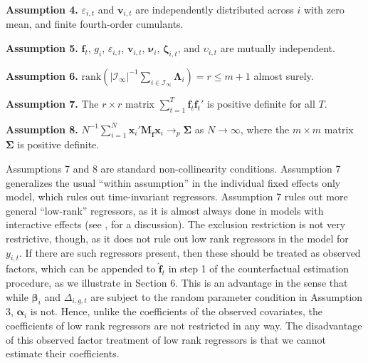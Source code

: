 \documentclass[12pt,fleqn]{article}
\def\*#1{\mathbf{#1}}
\def\+#1{\boldsymbol{#1}}
\begin{document}
\bigskip

\noindent \textbf{Assumption 4.} $\varepsilon_{i,t}$ and $\*v_{i,t}$ are independently distributed across $i$ with zero mean, and finite fourth-order cumulants.

\bigskip

\noindent \textbf{Assumption 5.} $\*f_t$, $g_i$, $\varepsilon_{i,t}$, $\*v_{i,t}$, $\+\nu_i$, $\+\zeta_{i,t}$, and $\upsilon_{i,t}$ are mutually independent.

\bigskip

\noindent \textbf{Assumption 6.} $\mathrm{rank}(|\mathcal{I}_{\infty}|^{-1}\sum_{i \in \mathcal{I}_{\infty}} \+\Lambda_i ) = r \leq m+1$ almost surely.

\bigskip

\noindent \textbf{Assumption 7.} The $r \times r$ matrix $\sum_{t=1}^T\*f_t\*f_t'$ is positive definite for all $T$.

\bigskip

\noindent \textbf{Assumption 8.} $N^{-1}\sum_{i=1}^N \*x_{i}'\*M_{\widehat{\*f}} \*x_{i} \to_p \+\Sigma$ as $N\to\infty$, where the $m\times m$ matrix $\+\Sigma$ is positive definite.

\bigskip

Assumptions 7 and 8 are standard non-collinearity conditions. Assumption 7 generalizes the usual ``within assumption'' in the individual fixed effects only model, which rules out time-invariant regressors. Assumption 7 rules out more general ``low-rank'' regressors, as it is almost always done in models with interactive effects (see \citealp{moon2015linear}, for a discussion). The exclusion restriction is not very restrictive, though, as it does not rule out low rank regressors in the model for $y_{i,t}$. If there are such regressors present, then these should be treated as observed factors, which can be appended to $\widehat{\*f}_t$ in step 1 of the counterfactual estimation procedure, as we illustrate in Section 6. This is an advantage in the sense that while $\+\beta_{i}$ and $\Delta_{i,g,t}$ are subject to the random parameter condition in Assumption 3, $\+\alpha_i$ is not. Hence, unlike the coefficients of the observed covariates, the coefficients of low rank regressors are not restricted in any way. The disadvantage of this observed factor treatment of low rank regressors is that we cannot estimate their coefficients.
\end{document}
